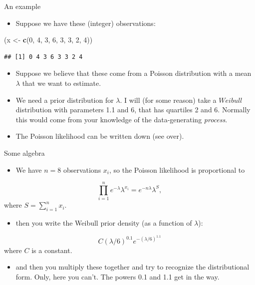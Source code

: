 \documentclass[
  ignorenonframetext,
]{beamer}
\newenvironment{Shaded}{\begin{snugshade}}{\end{snugshade}}
\newcommand{\DecValTok}[1]{\textcolor[rgb]{0.00,0.00,0.81}{#1}}
\newcommand{\KeywordTok}[1]{\textcolor[rgb]{0.13,0.29,0.53}{\textbf{#1}}}
\newcommand{\NormalTok}[1]{#1}
\newcommand{\StringTok}[1]{\textcolor[rgb]{0.31,0.60,0.02}{#1}}
\providecommand{\tightlist}{%
  \setlength{\itemsep}{0pt}\setlength{\parskip}{0pt}}
\begin{document}
\begin{frame}[fragile]{An example}
\protect\hypertarget{an-example}{}

\begin{itemize}
\tightlist
\item
  Suppose we have these (integer) observations:
\end{itemize}

\begin{Shaded}
\begin{Highlighting}[]
\NormalTok{(x <-}\StringTok{ }\KeywordTok{c}\NormalTok{(}\DecValTok{0}\NormalTok{, }\DecValTok{4}\NormalTok{, }\DecValTok{3}\NormalTok{, }\DecValTok{6}\NormalTok{, }\DecValTok{3}\NormalTok{, }\DecValTok{3}\NormalTok{, }\DecValTok{2}\NormalTok{, }\DecValTok{4}\NormalTok{))}
\end{Highlighting}
\end{Shaded}

\begin{verbatim}
## [1] 0 4 3 6 3 3 2 4
\end{verbatim}

\begin{itemize}
\tightlist
\item
  Suppose we believe that these come from a Poisson distribution with a
  mean \(\lambda\) that we want to estimate.
\item
  We need a prior distribution for \(\lambda\). I will (for some reason)
  take a \(Weibull\) distribution with parameters 1.1 and 6, that has
  quartiles 2 and 6. Normally this would come from your knowledge of the
  data-generating \emph{process}.
\item
  The Poisson likelihood can be written down (see over).
\end{itemize}

\end{frame}

\begin{frame}{Some algebra}
\protect\hypertarget{some-algebra}{}

\begin{itemize}
\tightlist
\item
  We have \(n=8\) observations \(x_i\), so the Poisson likelihood is
  proportional to
\end{itemize}

\[ \prod_{i=1}^n e^{-\lambda} \lambda^{x_i} = e^{-n\lambda} \lambda^S, \]
where \(S=\sum_{i=1}^n x_i\).

\begin{itemize}
\tightlist
\item
  then you write the Weibull prior density (as a function of
  \(\lambda\)):
\end{itemize}

\[ C (\lambda/6)^{0.1} e^{-(\lambda/6)^{1.1}}  \] where \(C\) is a
constant.

\begin{itemize}
\tightlist
\item
  and then you multiply these together and try to recognize the
  distributional form. Only, here you can't. The powers 0.1 and 1.1 get
  in the way.
\end{itemize}

\end{frame}
\end{document}
